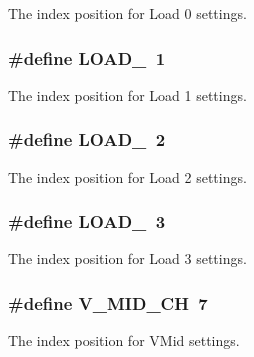 The index position for Load 0 settings. \hypertarget{a00020_a363f09c63f2ecb9086b47d72a3f3f57d}{
\subsubsection[{L\-O\-A\-D\-\_\-1}]{\setlength{\rightskip}{0pt plus 5cm}\#define L\-O\-A\-D\-\_~1}}\label{a00020_a363f09c63f2ecb9086b47d72a3f3f57d}
The index position for Load 1 settings. \hypertarget{a00020_af7c1e96216e7b48160e5a03afe8ac807}{
\subsubsection[{L\-O\-A\-D\-\_\-2}]{\setlength{\rightskip}{0pt plus 5cm}\#define L\-O\-A\-D\-\_~2}}\label{a00020_af7c1e96216e7b48160e5a03afe8ac807}
The index position for Load 2 settings. \hypertarget{a00020_a2c862ec4115c4a016b61800609f236a7}{
\subsubsection[{L\-O\-A\-D\-\_\-3}]{\setlength{\rightskip}{0pt plus 5cm}\#define L\-O\-A\-D\-\_~3}}\label{a00020_a2c862ec4115c4a016b61800609f236a7}
The index position for Load 3 settings. \hypertarget{a00020_a1ae2d3caef45c64fbb9175c50c27ce09}{
\subsubsection[{V\-\_\-\-M\-I\-D\-\_\-\-C\-H}]{\setlength{\rightskip}{0pt plus 5cm}\#define V\-\_\-\-M\-I\-D\-\_\-\-C\-H~7}}\label{a00020_a1ae2d3caef45c64fbb9175c50c27ce09}
The index position for V\-Mid settings. 

